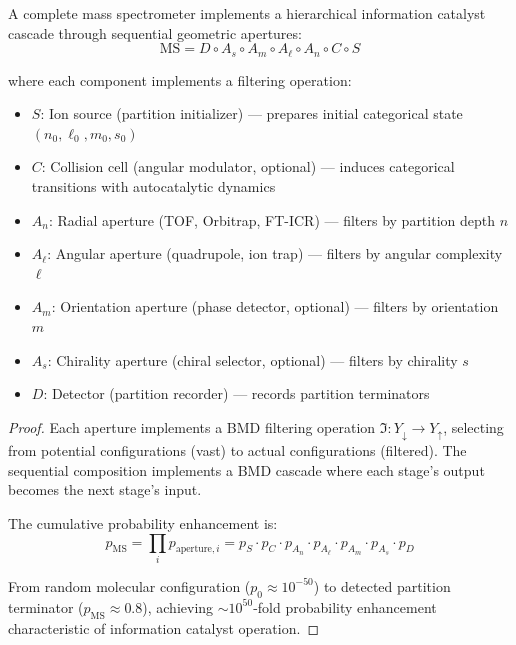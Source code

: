 \begin{theorem}
\label{thm:ms_bmd_cascade}
A complete mass spectrometer implements a hierarchical information catalyst cascade through sequential geometric apertures:
\begin{equation}
\text{MS} = D \circ A_s \circ A_m \circ A_\ell \circ A_n \circ C \circ S
\end{equation}

where each component implements a filtering operation:
\begin{itemize}
    \item $S$: Ion source (partition initializer) — prepares initial categorical state $(n_0, \ell_0, m_0, s_0)$
    \item $C$: Collision cell (angular modulator, optional) — induces categorical transitions with autocatalytic dynamics
    \item $A_n$: Radial aperture (TOF, Orbitrap, FT-ICR) — filters by partition depth $n$
    \item $A_\ell$: Angular aperture (quadrupole, ion trap) — filters by angular complexity $\ell$
    \item $A_m$: Orientation aperture (phase detector, optional) — filters by orientation $m$
    \item $A_s$: Chirality aperture (chiral selector, optional) — filters by chirality $s$
    \item $D$: Detector (partition recorder) — records partition terminators
\end{itemize}
\end{theorem}

\begin{proof}
Each aperture implements a BMD filtering operation $\mathfrak{I}: Y_{\downarrow} \to Y_{\uparrow}$, selecting from potential configurations (vast) to actual configurations (filtered). The sequential composition implements a BMD cascade where each stage's output becomes the next stage's input.

The cumulative probability enhancement is:
\begin{equation}
p_{\text{MS}} = \prod_{i} p_{\text{aperture},i} = p_S \cdot p_C \cdot p_{A_n} \cdot p_{A_\ell} \cdot p_{A_m} \cdot p_{A_s} \cdot p_D
\end{equation}

From random molecular configuration ($p_0 \approx 10^{-50}$) to detected partition terminator ($p_{\text{MS}} \approx 0.8$), achieving $\sim 10^{50}$-fold probability enhancement characteristic of information catalyst operation.
\end{proof}

